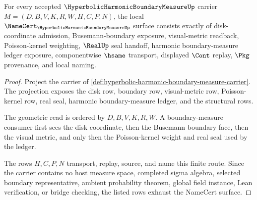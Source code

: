 \begin{theorem}
\label{thm:hyperbolic-harmonic-boundary-measure-namecert-obligations}
For every accepted $\HyperbolicHarmonicBoundaryMeasureUp$ carrier $M=(D,B,V,K,R,W,H,C,P,N)$, the local $\NameCert_{\HyperbolicHarmonicBoundaryMeasureUp}$ surface consists exactly of disk-coordinate admission, Busemann-boundary exposure, visual-metric readback, Poisson-kernel weighting, $\RealUp$ seal handoff, harmonic boundary-measure ledger exposure, componentwise $\hsame$ transport, displayed $\Cont$ replay, $\Pkg$ provenance, and local naming.
\end{theorem}
\begin{proof}
Project the carrier of \autoref{def:hyperbolic-harmonic-boundary-measure-carrier}. The projection exposes the disk row, boundary row, visual-metric row, Poisson-kernel row, real seal, harmonic boundary-measure ledger, and the structural rows.

The geometric read is ordered by $D,B,V,K,R,W$. A boundary-measure consumer first sees the disk coordinate, then the Busemann boundary face, then the visual metric, and only then the Poisson-kernel weight and real seal used by the ledger.

The rows $H,C,P,N$ transport, replay, source, and name this finite route. Since the carrier contains no host measure space, completed sigma algebra, selected boundary representative, ambient probability theorem, global field instance, Lean verification, or bridge checking, the listed rows exhaust the NameCert surface.
\end{proof}

